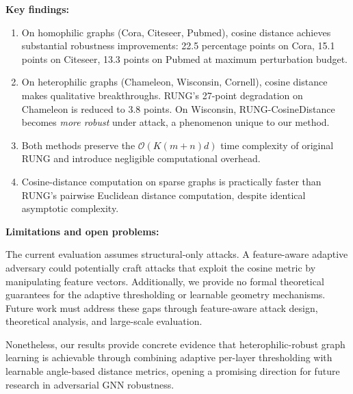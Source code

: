 \documentclass[sigconf]{acmart}
\begin{document}
\textbf{Key findings:}

\begin{enumerate}
\item On homophilic graphs (Cora, Citeseer, Pubmed), cosine distance achieves substantial robustness improvements: 22.5 percentage points on Cora, 15.1 points on Citeseer, 13.3 points on Pubmed at maximum perturbation budget.

\item On heterophilic graphs (Chameleon, Wisconsin, Cornell), cosine distance makes qualitative breakthroughs. RUNG's 27-point degradation on Chameleon is reduced to 3.8 points. On Wisconsin, RUNG-CosineDistance becomes \emph{more robust} under attack, a phenomenon unique to our method.

\item Both methods preserve the $\mathcal{O}(K(m+n)d)$ time complexity of original RUNG and introduce negligible computational overhead.

\item Cosine-distance computation on sparse graphs is practically faster than RUNG's pairwise Euclidean distance computation, despite identical asymptotic complexity.
\end{enumerate}

\textbf{Limitations and open problems:}

The current evaluation assumes structural-only attacks. A feature-aware adaptive adversary could potentially craft attacks that exploit the cosine metric by manipulating feature vectors. Additionally, we provide no formal theoretical guarantees for the adaptive thresholding or learnable geometry mechanisms. Future work must address these gaps through feature-aware attack design, theoretical analysis, and large-scale evaluation.

Nonetheless, our results provide concrete evidence that heterophilic-robust graph learning is achievable through combining adaptive per-layer thresholding with learnable angle-based distance metrics, opening a promising direction for future research in adversarial GNN robustness.



\end{document}
